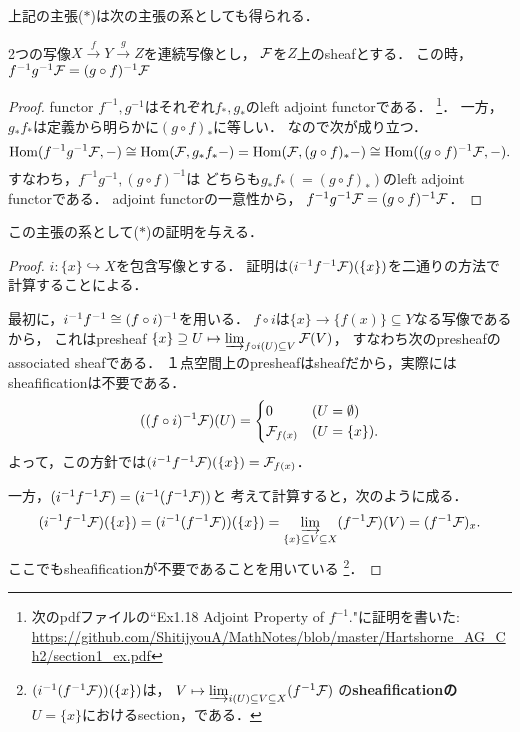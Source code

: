 \documentclass[a4paper]{jsarticle}
\begin{document}
上記の主張($*$)は次の主張の系としても得られる．
\begin{Claim}
    2つの写像$X \xrightarrow{f} Y \xrightarrow{g} Z$を連続写像とし，
    $\mathcal{F}$を$Z$上のsheafとする．
    この時，$f^{-1}g^{-1}\mathcal{F}=(g \circ f)^{-1}\mathcal{F}$
\end{Claim}
\begin{proof}
    functor $f^{-1}, g^{-1}$はそれぞれ$f_*,g_*$のleft adjoint functorである．
    \footnote
    {
        次のpdfファイルの``Ex1.18 Adjoint Property of $f^{-1}$."に証明を書いた:
        \url{https://github.com/ShitijyouA/MathNotes/blob/master/Hartshorne_AG_Ch2/section1_ex.pdf}
    }．
    一方，$g_* f_*$は定義から明らかに$(g \circ f)_*$に等しい．
    なので次が成り立つ．
    \[
        \operatorname{Hom}(f^{-1}g^{-1}\mathcal{F}, -)
        \cong \operatorname{Hom}(\mathcal{F}, g_* f_* -)
        =\operatorname{Hom}(\mathcal{F}, (g \circ f)_* -)
        \cong \operatorname{Hom}((g \circ f)^{-1} \mathcal{F},  -).
    \]
    すなわち，$f^{-1}g^{-1}, (g \circ f)^{-1}$は
    どちらも$g_* f_*(=(g \circ f)_*)$のleft adjoint functorである．
    adjoint functorの一意性から，
    $f^{-1}g^{-1}\mathcal{F}=(g \circ f)^{-1}\mathcal{F}$．
\end{proof}

この主張の系として($*$)の証明を与える．
\begin{proof}
    $i: \{x\} \hookrightarrow X$を包含写像とする．
    証明は$(i^{-1}f^{-1} \mathcal{F})(\{x\})$を二通りの方法で計算することによる．
    
    最初に，$i^{-1}f^{-1} \cong (f \circ i)^{-1}$を用いる．
    $f \circ i$は$\{x\} \to \{f(x)\} \subseteq Y$なる写像であるから，
    これはpresheaf $\{x\} \supseteq U  \mapsto \varinjlim_{f \circ i(U) \subseteq V} \mathcal{F}(V)$，
    すなわち次のpresheafのassociated sheafである．
    １点空間上のpresheafはsheafだから，実際にはsheafificationは不要である．
    \[
        ((f \circ i)^{-1}\mathcal{F})(U)=
        \begin{cases}{}
            0 & (U=\emptyset) \\
            \mathcal{F}_{f(x)} & (U=\{x\}).
        \end{cases}
    \]
    よって，この方針では$(i^{-1}f^{-1} \mathcal{F})(\{x\})=\mathcal{F}_{f(x)}$．

    一方，$(i^{-1}f^{-1} \mathcal{F})=(i^{-1}(f^{-1} \mathcal{F}))$と
    考えて計算すると，次のように成る．
    \[
        (i^{-1}f^{-1} \mathcal{F})(\{x\})
        =(i^{-1}(f^{-1} \mathcal{F}))(\{x\})
        =\varinjlim_{\{x\} \subseteq V \subseteq X}(f^{-1} \mathcal{F})(V)
        =(f^{-1} \mathcal{F})_{x}.
    \]
    ここでもsheafificationが不要であることを用いている
    \footnote
    {
        $(i^{-1}(f^{-1} \mathcal{F}))(\{x\})$は，
        $V \mapsto \varinjlim_{i(U) \subseteq V \subseteq X}(f^{-1} \mathcal{F})$
        の\textbf{sheafificationの}
        $U=\{x\}$におけるsection，である．
    }．
\end{proof}
\end{document}
